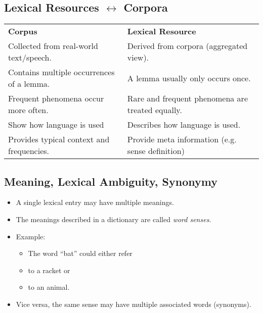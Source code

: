 		\subsection{Lexical Resources \( \leftrightarrow \) Corpora} %
			\begin{table}[H]
				\centering
				\begin{tabular}{l l}
					\textbf{Corpus}                           & \textbf{Lexical Resource}                        \\
					Collected from real-world text/speech.    & Derived from corpora (aggregated view).          \\
					Contains multiple occurrences of a lemma. & A lemma usually only occurs once.                \\
					Frequent phenomena occur more often.      & Rare and frequent phenomena are treated equally. \\
					Show how language is used                 & Describes how language is used.                  \\
					Provides typical context and frequencies. & Provide meta information (e.g. sense definition)
				\end{tabular}
			\end{table}

		\subsection{Meaning, Lexical Ambiguity, Synonymy} %
			\begin{itemize}
				\item A single lexical entry may have multiple meanings.
				\item The meanings described in a dictionary are called \textit{word senses}.
				\item Example:
					\begin{itemize}
						\item The word \enquote{bat} could either refer
						\item to a racket or
						\item to an animal.
					\end{itemize}
				\item Vice versa, the same sense may have multiple associated words (synonyms).
			\end{itemize}

